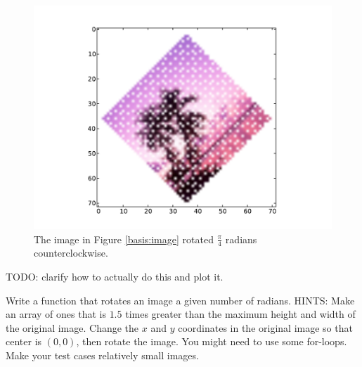 \begin{figure}
\centering
\includegraphics[width=\textwidth]{rotateimg.pdf}
\caption{The image in Figure \ref{basis:image} rotated $\frac{\pi}{4}$ radians counterclockwise.}
\end{figure}

TODO: clarify how to actually do this and plot it.

\begin{problem}
Write a function that rotates an image a given number of radians.
HINTS: Make an array of ones that is $1.5$ times greater than the maximum height and width of the original image.
Change the $x$ and $y$ coordinates in the original image so that center is $(0,0)$, then rotate the image.
You might need to use some for-loops.
Make your test cases relatively small images.
\end{problem}


